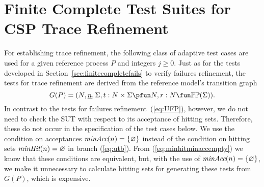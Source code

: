\section{Finite Complete Test Suites for CSP Trace Refinement}
\label{sec:finitecomplete}

For establishing trace refinement, the following class of adaptive test cases
are used for a given reference process $P$ and  integers $j \ge 0$. Just as
for the tests developed  in Section~\ref{sec:finitecompletefails} to verify
failures refinement, the tests for trace refinement are derived from the
reference model's transition graph
$$
G(P) = ( N, \ii n, \Sigma, t : N\times\Sigma \pfun N, r : N \fun \mathbb{P}\mathbb{P}(\Sigma)).
$$
In contrast to the tests for failures refinement~(\ref{eq:UFP}), however, we
do not need to check the SUT with respect to its acceptance of hitting sets.
Therefore, these do not occur in the specification of the test cases below.
We use the condition on acceptances $\text{\it minAcc}(n) = \{ \varnothing \}$ instead
of the condition on hitting sets $\text{\it minHit}(n) = \varnothing$ in branch
(\ref{eq:utb}). From (\ref{eq:minhitminaccempty}) we know that these
conditions are equivalent, but, with the use of $\text{\it minAcc}(n) = \{ \varnothing
\}$, \pagebreak we make it unnecessary to calculate hitting sets for
generating these tests from $G(P)$, which is expensive.


